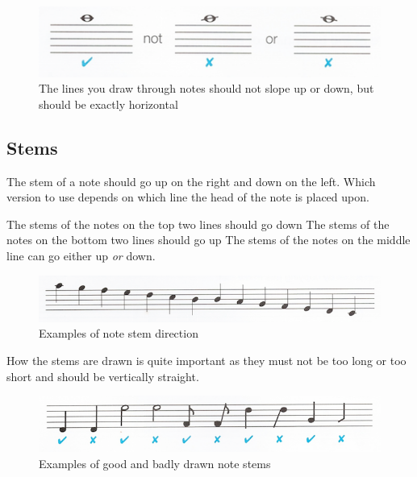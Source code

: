 \begin{figure}[h!]
  \includegraphics[width=\linewidth]{gfx/basic/ledger-slope.png}
  \centering
  \caption{The lines you draw through notes should not slope up or down, but should be exactly horizontal}
  \label{fig:LedgerSlope}
\end{figure}

\subsection{Stems}

The stem of a note should go up on the right and down on the left. Which version to use depends on which line the head of the note is placed upon.

The stems of the notes on the top two lines should go down
The stems of the notes on the bottom two lines should go up
The stems of the notes on the middle line can go either up \emph{or} down.

\begin{figure}[h!]
  \includegraphics[width=\linewidth]{gfx/basic/stems-chromatic.png}
  \centering
  \caption{Examples of note stem direction}
  \label{fig:StemsChromatic}
\end{figure}

How the stems are drawn is quite important as they must not be too long or too short and should be vertically straight.

\begin{figure}[h!]
  \includegraphics[width=\linewidth]{gfx/basic/stems-good-bad.png}
  \centering
  \caption{Examples of good and badly drawn note stems}
  \label{fig:StemsGoodBad}
\end{figure}

